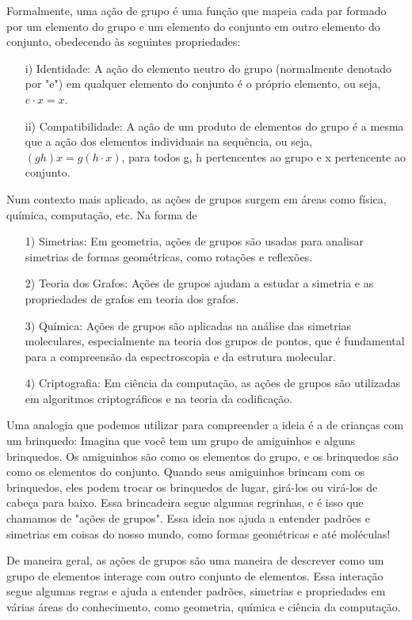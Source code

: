 \documentclass{article}
\begin{document}
  Formalmente, uma ação de grupo é uma função que mapeia cada par formado por um elemento do grupo e um elemento do
conjunto em outro elemento do conjunto, obedecendo às seguintes propriedades:
\begin{itemize}
  \item[i)] Identidade: A ação do elemento neutro do grupo (normalmente denotado por "e") em qualquer elemento do conjunto é o próprio elemento, ou seja, $e \cdot x = x.$
  \item[ii)] Compatibilidade: A ação de um produto de elementos do grupo é a mesma que a ação dos elementos 
  individuais na sequência, ou seja, $(gh)x = g(h \cdot x)$, para todos g, h pertencentes ao grupo e x pertencente ao conjunto.
\end{itemize}
Num contexto mais aplicado, as a\c c\~oes de grupos surgem em \'areas como f\'isica, qu\'imica, computa\c c\~ao, etc.
Na forma de 
\begin{itemize}
  \item[1)] Simetrias: Em geometria, ações de grupos são usadas para analisar simetrias de formas geométricas, como rotações e reflexões.
  \item[2)] Teoria dos Grafos: Ações de grupos ajudam a estudar a simetria e as propriedades de grafos em teoria dos grafos.
  \item[3)] Química: Ações de grupos são aplicadas na análise das simetrias moleculares, especialmente na teoria dos grupos de pontos, que é fundamental para a compreensão da espectroscopia e da estrutura molecular.
  \item[4)] Criptografia: Em ciência da computação, as ações de grupos são utilizadas em algoritmos criptográficos e na teoria da codificação.
\end{itemize}
  Uma analogia que podemos utilizar para compreender a ideia \'e a de crian\c cas com um brinquedo: Imagina que
você tem um grupo de amiguinhos e alguns brinquedos. Os amiguinhos são como os elementos do grupo, e os brinquedos
são como os elementos do conjunto. Quando seus amiguinhos brincam com os brinquedos, eles podem trocar os brinquedos
de lugar, girá-los ou virá-los de cabeça para baixo. Essa brincadeira segue algumas regrinhas, e é isso que chamamos de "ações de grupos".
Essa ideia nos ajuda a entender padrões e simetrias em coisas do nosso mundo, como formas geométricas e até moléculas!

  De maneira geral, as ações de grupos são uma maneira de descrever como um grupo de elementos interage com outro conjunto de elementos. Essa 
interação segue algumas regras e ajuda a entender padrões, simetrias e propriedades em várias áreas do conhecimento, como geometria, química e ciência da computação.
\end{document}
